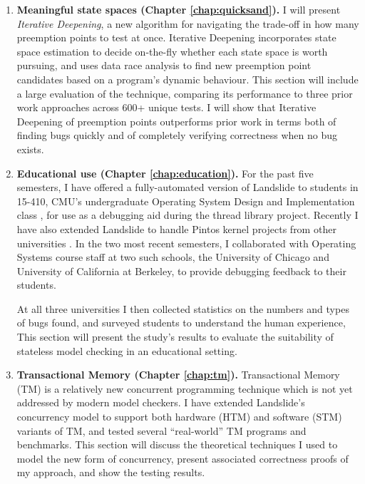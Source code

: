 \begin{enumerate}
	\item {\bf Meaningful state spaces (Chapter \ref{chap:quicksand}).}
		I will present {\em Iterative Deepening}, a new algorithm for navigating the trade-off in how many preemption points to test at once.
		Iterative Deepening incorporates state space estimation \cite{estimation} to decide on-the-fly whether each state space is worth pursuing, and uses data race analysis \cite{tsan} to find new preemption point candidates based on a program's dynamic behaviour.
		This section will include a large evaluation of the technique, comparing its performance to three prior work approaches across 600+ unique tests.
		I will show that Iterative Deepening of preemption points outperforms prior work in terms both of finding bugs quickly and of completely verifying correctness when no bug exists.
	\item {\bf Educational use (Chapter \ref{chap:education}).}
		For the past five semesters, I have offered a fully-automated version of Landslide to students in 15-410, CMU's undergraduate Operating System Design and Implementation class \cite{kspec,thrlib}, for use as a debugging aid during the thread library project.
		Recently I have also extended Landslide to handle Pintos kernel projects from other universities \cite{pintos}.
		In the two most recent semesters, I collaborated with Operating Systems course staff at two such schools, the University of Chicago and University of California at Berkeley,
		to provide debugging feedback to their students.

		At all three universities I then collected statistics on the numbers and types of bugs found,
		and surveyed students to understand the human experience,
		This section will present the study's results
		to evaluate the suitability of stateless model checking in an educational setting.
	\item {\bf Transactional Memory (Chapter \ref{chap:tm}).}
		Transactional Memory (TM) is a relatively new concurrent programming technique \cite{transactional-memory}
		which is not yet addressed by modern model checkers.
		I have extended Landslide's concurrency model to support both hardware (HTM) and software (STM) variants of TM,
		and tested several ``real-world'' TM programs and benchmarks.
		This section will discuss the theoretical techniques I used to model the new form of concurrency,
		present associated correctness proofs of my approach,
		and show the testing results.
\end{enumerate}

